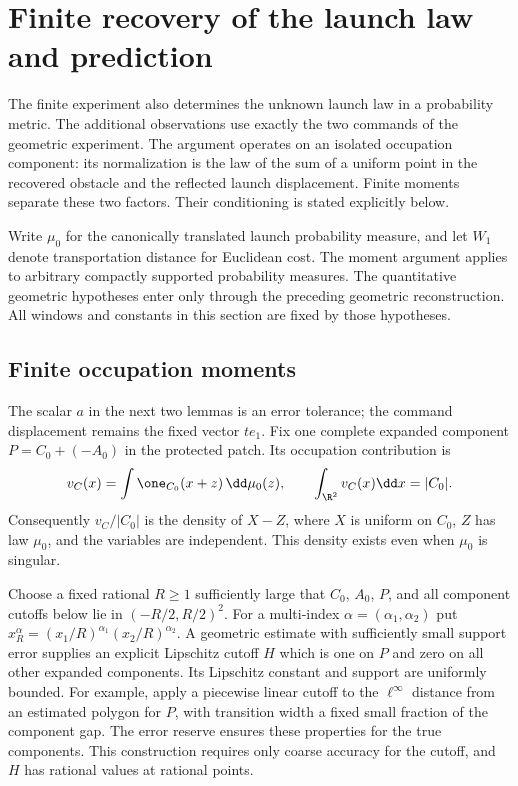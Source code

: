 \section{Finite recovery of the launch law and prediction}
\label{sec:two-field-finite-law}
The finite experiment also determines the unknown launch law in a
probability metric.  The additional observations use exactly the two
commands of the geometric experiment.  The argument operates on an
isolated occupation component: its normalization is the law of the
sum of a uniform point in the recovered obstacle and the reflected
launch displacement.  Finite moments separate these two factors.
Their conditioning is stated explicitly below.

Write $\mu_0$ for the canonically translated launch probability
measure, and let $W_1$ denote transportation distance for Euclidean
cost.  The moment argument applies to arbitrary compactly supported
probability measures.  The quantitative geometric hypotheses enter
only through the preceding geometric reconstruction.  All windows
and constants in this section are fixed by those hypotheses.

\subsection{Finite occupation moments}
The scalar $a$ in the next two lemmas is an error tolerance; the
command displacement remains the fixed vector $te_1$.
Fix one complete expanded component $P=C_0+(-A_0)$ in the protected
patch.  Its occupation contribution is
\begin{equation}\label{eq:two-field-component-occupation}
 v_C(x)=\int\one_{C_0}(x+z)\,\dd\mu_0(z),\qquad
 \int_{\R^2}v_C(x)\dd x=|C_0|.
\end{equation}
Consequently $v_C/|C_0|$ is the density of $X-Z$, where $X$ is uniform
on $C_0$, $Z$ has law $\mu_0$, and the variables are independent.
This density exists even when $\mu_0$ is singular.

Choose a fixed rational $R\ge1$ sufficiently large that $C_0$, $A_0$,
$P$, and all component cutoffs below lie in $(-R/2,R/2)^2$.
For a multi-index $\alpha=(\alpha_1,\alpha_2)$ put
$x_R^\alpha=(x_1/R)^{\alpha_1}(x_2/R)^{\alpha_2}$.
A geometric estimate with sufficiently small support error supplies
an explicit Lipschitz cutoff $H$ which is one on $P$ and zero on
all other expanded components.  Its Lipschitz constant and support
are uniformly bounded.  For example, apply a piecewise linear
cutoff to the $\ell^\infty$ distance from an estimated polygon for
$P$, with transition width a fixed small fraction of the component
gap.  The error reserve ensures these properties for the true
components.  This construction requires only coarse accuracy for
the cutoff, and $H$ has rational values at rational points.

